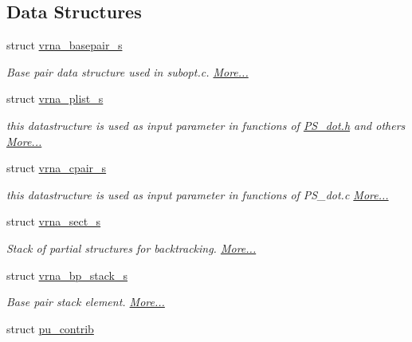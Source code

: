 \subsection*{Data Structures}
\begin{DoxyCompactItemize}
\item 
struct \hyperlink{group__data__structures_structvrna__basepair__s}{vrna\+\_\+basepair\+\_\+s}
\begin{DoxyCompactList}\small\item\em Base pair data structure used in subopt.\+c.  \hyperlink{group__data__structures_structvrna__basepair__s}{More...}\end{DoxyCompactList}\item 
struct \hyperlink{group__data__structures_structvrna__plist__s}{vrna\+\_\+plist\+\_\+s}
\begin{DoxyCompactList}\small\item\em this datastructure is used as input parameter in functions of \hyperlink{PS__dot_8h}{P\+S\+\_\+dot.\+h} and others  \hyperlink{group__data__structures_structvrna__plist__s}{More...}\end{DoxyCompactList}\item 
struct \hyperlink{group__data__structures_structvrna__cpair__s}{vrna\+\_\+cpair\+\_\+s}
\begin{DoxyCompactList}\small\item\em this datastructure is used as input parameter in functions of P\+S\+\_\+dot.\+c  \hyperlink{group__data__structures_structvrna__cpair__s}{More...}\end{DoxyCompactList}\item 
struct \hyperlink{group__data__structures_structvrna__sect__s}{vrna\+\_\+sect\+\_\+s}
\begin{DoxyCompactList}\small\item\em Stack of partial structures for backtracking.  \hyperlink{group__data__structures_structvrna__sect__s}{More...}\end{DoxyCompactList}\item 
struct \hyperlink{group__data__structures_structvrna__bp__stack__s}{vrna\+\_\+bp\+\_\+stack\+\_\+s}
\begin{DoxyCompactList}\small\item\em Base pair stack element.  \hyperlink{group__data__structures_structvrna__bp__stack__s}{More...}\end{DoxyCompactList}\item 
struct \hyperlink{group__data__structures_structpu__contrib}{pu\+\_\+contrib}

\end{DoxyCompactItemize}
